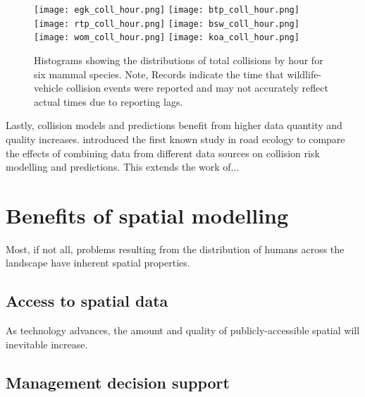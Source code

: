 \begin{figure*}[htp]
  \centering
	\begin{minipage}[t]{.9\textwidth}
    	\centering
    	\texttt{[image: egk\_coll\_hour.png]}\hspace{.05\textwidth}
    	\texttt{[image: btp\_coll\_hour.png]}\\ 
    	\texttt{[image: rtp\_coll\_hour.png]}\hspace{.05\textwidth}
    	\texttt{[image: bsw\_coll\_hour.png]}\\
    	\texttt{[image: wom\_coll\_hour.png]}\hspace{.05\textwidth}
    	\texttt{[image: koa\_coll\_hour.png]}
    \end{minipage}
  \caption[Total collisions by hour for six mammal species]{Histograms showing the distributions of total collisions by hour for six mammal species. Note, Records indicate the time that wildlife-vehicle collision events were reported and may not accurately reflect actual times due to reporting lags.}
  \label{temporal_all}
\end{figure*}

Lastly, collision models and predictions benefit from higher data quantity and quality increases.  introduced the first known study in road ecology to compare the effects of combining data from different data sources on collision risk modelling and predictions. This extends the work of...

\section{Benefits of spatial modelling}

Most, if not all, problems resulting from the distribution of humans across the landscape have inherent spatial properties. 

\subsection{Access to spatial data}

As technology advances, the amount and quality of publicly-accessible spatial will inevitable increase.

\subsection{Management decision support}

